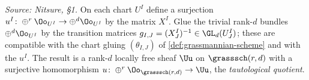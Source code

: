 \begin{definition}
  \label{def:grassmannian-universal-quotient}
  \textit{Source: Nitsure, §1.}
  On each chart $U^I$ define a surjection $u^I\colon\oplus^r\Oo_{U^I}\to
  \oplus^d\Oo_{U^I}$ by the matrix $X^I$. Glue the trivial rank-$d$ bundles
  $\oplus^d\Oo_{U^I}$ by the transition matrices $g_{I,J} = (X^I_J)^{-1}\in
  \GL_d(U^I_J)$; these are compatible with the chart gluing $(\theta_{I,J})$ of
  \cref{def:grassmannian-scheme} and with the $u^I$. The result is a rank-$d$
  locally free sheaf $\Uu$ on $\grasssch(r,d)$ with a surjective homomorphism
  $u\colon\oplus^r\Oo_{\grasssch(r,d)}\to\Uu$, the \emph{tautological quotient}.
\end{definition}

